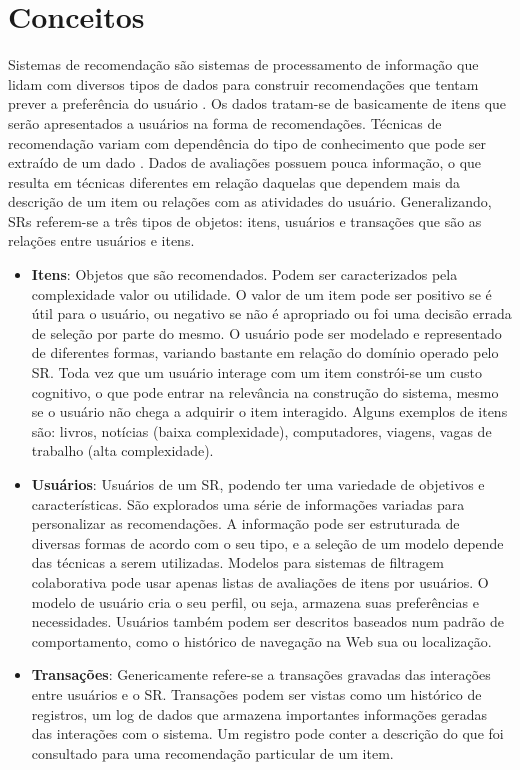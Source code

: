 \section{Conceitos}
\label{sec:conceitosSistemaRecomendacao}

Sistemas de recomendação são sistemas de processamento de informação que lidam com diversos tipos de dados para construir recomendações que tentam prever a preferência do usuário \citep{Ricci2011}.  Os dados tratam-se de basicamente de itens que serão apresentados a usuários na forma de recomendações. Técnicas de recomendação variam com dependência do tipo de conhecimento que pode ser extraído de um dado \citep{Ricci2011}. Dados de avaliações possuem pouca informação, o que resulta em técnicas diferentes em relação daquelas que dependem mais da descrição de um item ou relações com as atividades do usuário. Generalizando, SRs referem-se a três tipos de objetos: itens, usuários e transações que são as relações entre usuários e itens.

\begin{itemize}
	\item{\textbf{Itens}: Objetos que são recomendados. Podem ser caracterizados pela complexidade valor ou utilidade. O valor de um item pode ser positivo se é útil para o usuário, ou negativo se não é apropriado ou foi uma decisão errada de seleção por parte do mesmo. O usuário pode ser modelado e representado de diferentes formas, variando bastante em relação do domínio operado pelo SR. Toda vez que um usuário interage com um item constrói-se um custo cognitivo, o que pode entrar na relevância na construção do sistema, mesmo se o usuário não chega a adquirir o item interagido. Alguns exemplos de itens são: livros, notícias (baixa complexidade), computadores, viagens, vagas de trabalho (alta complexidade).}

	\item{\textbf{Usuários}: Usuários de um SR, podendo ter uma variedade de objetivos e características. São explorados uma série de informações variadas para personalizar as recomendações. A informação pode ser estruturada de diversas formas de acordo com o seu tipo, e a seleção de um modelo depende das técnicas a serem utilizadas. Modelos para sistemas de filtragem colaborativa pode usar apenas listas de avaliações de itens por usuários. O modelo de usuário cria o seu perfil, ou seja, armazena suas preferências e necessidades. Usuários também podem ser descritos baseados num padrão de comportamento, como o histórico de navegação na Web sua ou localização.}

	\item{\textbf{Transações}: Genericamente refere-se a transações gravadas das interações entre usuários e o SR. Transações podem ser vistas como um histórico de registros, um log de dados que armazena importantes informações geradas das interações com o sistema. Um registro pode conter a descrição do que foi consultado para uma recomendação particular de um item.}
\end{itemize}

